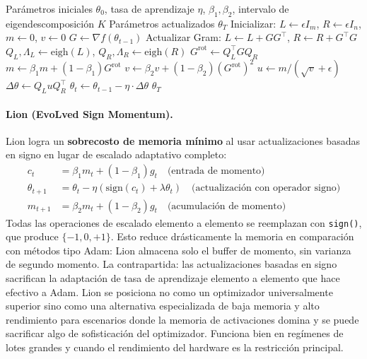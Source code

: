 \documentclass[11pt,a4paper]{article}
\begin{document}
\begin{algorithm}[H]
\caption{SOAP (Shampoo with Adam in Eigenbasis)}
\label{alg:soap}
\begin{algorithmic}[1]
\Require Parámetros iniciales $\theta_0$, tasa de aprendizaje $\eta$, $\beta_1, \beta_2$, intervalo de eigendescomposición $K$
\Ensure Parámetros actualizados $\theta_T$
\State Inicializar: $L \gets \epsilon I_m$, $R \gets \epsilon I_n$, $m \gets 0$, $v \gets 0$
    \State $G \gets \nabla f(\theta_{t-1})$ 
    \State Actualizar Gram: $L \gets L + G G^\top$, $R \gets R + G^\top G$
        \State $Q_L, \Lambda_L \gets \text{eigh}(L)$, $Q_R, \Lambda_R \gets \text{eigh}(R)$
    \EndIf
    \State $G^{\text{rot}} \gets Q_L^\top G Q_R$ 
    \State $m \gets \beta_1 m + (1-\beta_1) G^{\text{rot}}$ 
    \State $v \gets \beta_2 v + (1-\beta_2) (G^{\text{rot}})^2$ 
    \State $u \gets m / (\sqrt{v} + \epsilon)$ 
    \State $\Delta \theta \gets Q_L u Q_R^\top$ 
    \State $\theta_t \gets \theta_{t-1} - \eta \cdot \Delta \theta$
\EndFor
\Return $\theta_T$
\end{algorithmic}
\end{algorithm}

\paragraph{Lion (EvoLved Sign Momentum).}
Lion logra un \textbf{sobrecosto de memoria mínimo} al usar actualizaciones basadas en signo en lugar de escalado adaptativo completo:\begin{align}
c_t &= \beta_1 m_t + (1-\beta_1) g_t \quad\text{(entrada de momento)} \\
\theta_{t+1} &= \theta_t - \eta \left(\text{sign}(c_t) + \lambda\theta_t\right) \quad\text{(actualización con operador signo)} \\
m_{t+1} &= \beta_2 m_t + (1-\beta_2) g_t \quad\text{(acumulación de momento)}
\end{align}
Todas las operaciones de escalado elemento a elemento se reemplazan con \texttt{sign()}, que produce $\{-1, 0, +1\}$. Esto reduce drásticamente la memoria en comparación con métodos tipo Adam: Lion almacena solo el buffer de momento, sin varianza de segundo momento. La contrapartida: las actualizaciones basadas en signo sacrifican la adaptación de tasa de aprendizaje elemento a elemento que hace efectivo a Adam. Lion se posiciona no como un optimizador universalmente superior sino como una alternativa especializada de baja memoria y alto rendimiento para escenarios donde la memoria de activaciones domina y se puede sacrificar algo de sofisticación del optimizador. Funciona bien en regímenes de lotes grandes y cuando el rendimiento del hardware es la restricción principal.
\end{document}
